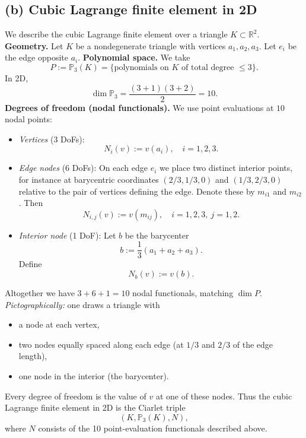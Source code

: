 \subsection*{(b) Cubic Lagrange finite element in 2D}
We describe the cubic Lagrange finite element over a triangle $K \subset \mathbb{R}^2$.
\textbf{Geometry.}
Let $K$ be a nondegenerate triangle with vertices $a_1,a_2,a_3$.
Let $e_i$ be the edge opposite $a_i$.
\textbf{Polynomial space.}
We take
\[
    P := \mathbb{P}_3(K)
    = \{ \text{polynomials on }K \text{ of total degree }\le 3 \}.
\]
In 2D,
\[
    \dim \mathbb{P}_3 = \frac{(3+1)(3+2)}{2} = 10.
\]
\textbf{Degrees of freedom (nodal functionals).}
We use point evaluations at $10$ nodal points:
\begin{itemize}
    \item \emph{Vertices} (3 DoFs):
          \[
              N_i(v) := v(a_i), \quad i=1,2,3.
          \]
    \item \emph{Edge nodes} (6 DoFs):
          On each edge $e_i$ we place two distinct interior points, for instance at
          barycentric coordinates $(2/3,1/3,0)$ and $(1/3,2/3,0)$ relative to
          the pair of vertices defining the edge. Denote these by $m_{i1}$ and $m_{i2}$.
          Then
          \[
              N_{i,j}(v) := v(m_{ij}), \quad i=1,2,3,\ j=1,2.
          \]
    \item \emph{Interior node} (1 DoF):
          Let $b$ be the barycenter
          \[
              b := \frac{1}{3}(a_1 + a_2 + a_3).
          \]
          Define
          \[
              N_b(v) := v(b).
          \]
\end{itemize}
Altogether we have $3 + 6 + 1 = 10$ nodal functionals, matching $\dim P$.
\emph{Pictographically:} one draws a triangle with
\begin{itemize}
    \item a node at each vertex,
    \item two nodes equally spaced along each edge (at $1/3$ and $2/3$ of the edge length),
    \item one node in the interior (the barycenter).
\end{itemize}
Every degree of freedom is the value of $v$ at one of these nodes.
Thus the cubic Lagrange finite element in 2D is the Ciarlet triple
\[
    (K, \mathbb{P}_3(K), N),
\]
where $N$ consists of the 10 point-evaluation functionals described above.
